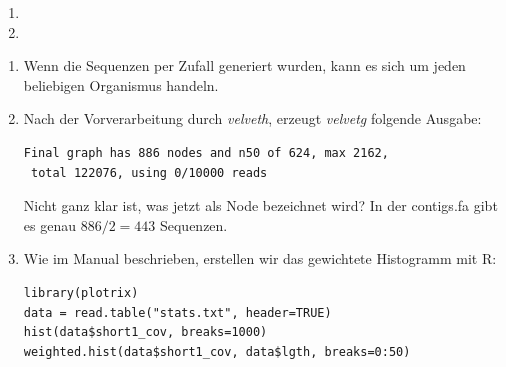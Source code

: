 \documentclass{homework}
\date{Montag, dem 7. Januar 2013}
\author{Stefan Meißner (4279113) und Niels Hoppe (4356370)}
\begin{document}
\maketitle
\begin{enumerate} 


\begin{enumerate}
\item 
\item 
\end{enumerate}


\begin{enumerate}
\item 
Wenn die Sequenzen per Zufall generiert wurden, kann es sich um jeden beliebigen Organismus handeln.
\item 
Nach der Vorverarbeitung durch \textit{velveth}, erzeugt \textit{velvetg} folgende Ausgabe:
\begin{verbatim}
Final graph has 886 nodes and n50 of 624, max 2162, 
 total 122076, using 0/10000 reads
\end{verbatim}
Nicht ganz klar ist, was jetzt als Node bezeichnet wird? In der contigs.fa gibt es genau $886 / 2 = 443$ Sequenzen.
\item 
Wie im Manual beschrieben, erstellen wir das gewichtete Histogramm mit R:
\begin{verbatim}
library(plotrix)
data = read.table("stats.txt", header=TRUE)
hist(data$short1_cov, breaks=1000)
weighted.hist(data$short1_cov, data$lgth, breaks=0:50)
\end{verbatim}

\end{enumerate}
\end{enumerate}
\end{document}

